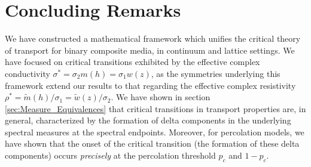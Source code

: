 \documentclass[english,12pt,jmp,graphicx]{revtex4-1}
\begin{document}
%
%

\section{Concluding Remarks}
%
We have constructed a mathematical framework which unifies the critical
theory of transport for binary composite media, in continuum and
lattice settings. We have focused on critical transitions exhibited by
the effective complex conductivity $\sigma^*=\sigma_2m(h)=\sigma_1w(z)$, as the
symmetries underlying this framework extend our results to that
regarding the effective complex resistivity
$\rho^*=\tilde{m}(h)/\sigma_1=\tilde{w}(z)/\sigma_2$. We have shown in section
\ref{sec:Measure_Equivalences} that critical transitions in transport
properties are, in general, characterized by the formation of delta
components in the underlying spectral measures at the spectral
endpoints. Moreover, for percolation models, we have shown that the
onset of the critical transition (the formation of these delta
components) occurs \emph{precisely} at the percolation threshold $p_c$
and $1-p_c$.        
\end{document}
